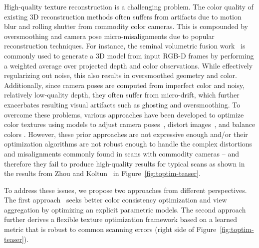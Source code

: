High-quality texture reconstruction is a challenging problem. The color quality of existing 3D reconstruction methods often suffers from artifacts due to motion blur and rolling shutter from commodity color cameras. 
This is compounded by oversmoothing and camera pose micro-misalignments due to popular reconstruction techniques.
For instance, the seminal volumetric fusion work~\cite{curless1996volumetric} is commonly used to generate a 3D model from input RGB-D frames by performing a weighted average over projected depth and color observations.
While effectively regularizing out noise, this also results in oversmoothed geometry and color.
Additionally, since camera poses are computed from imperfect color and noisy, relatively low-quality depth, they often suffer from micro-drift, which further exacerbates resulting visual artifacts such as ghosting and oversmoothing. To overcome these problems, various approaches have been developed to optimize color textures using models to adjust camera poses~\cite{zhou2014color}, distort images~\cite{bi2017patch,zhou2014color}, and balance colors \cite{zhou2014color}.  However, these prior approaches are not expressive enough and/or their optimization algorithms are not robust enough to handle the complex distortions and misalignments commonly found in scans with commodity cameras -- and therefore they fail to produce high-quality results for typical scans as shown in the results from Zhou and Koltun~\cite{zhou2014color} in Figure~\ref{fig:toptim-teaser}.

To address these issues, we propose two approaches from different perspectives. The first approach~\cite{huang20173dlite} seeks better color consistency optimization and view aggregation by optimizing an explicit parametric models. The second approach~\cite{huang2020adversarial} further derives a flexible texture optimization framework based on a learned metric that is robust to common scanning errors (right side of Figure~\ref{fig:toptim-teaser}).
 
